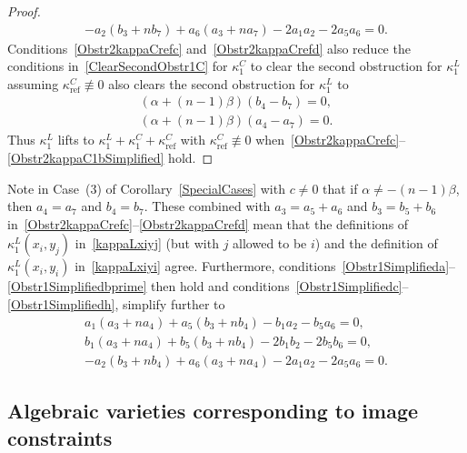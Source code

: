 \documentclass[pdftex]{sigma}
\numberwithin{equation}{section}
\DeclareMathOperator{\refl}{ref}
\begin{document}
\begin{proof}
\begin{gather}
\label{Obstr1Simplifiedh}
-a_2(b_3 + nb_7) + a_6(a_3 + na_7) - 2a_1 a_2 -2a_5 a_6=0.
\end{gather}
Conditions~\eqref{Obstr2kappaCrefc} and~\eqref{Obstr2kappaCrefd} also reduce the conditions in~\eqref{ClearSecondObstr1C} for $\kappa^C_1$ to
clear the second obstruction for $\kappa^L_1$ assuming $\kappa^C_{\refl} \not\equiv 0$
also clears the second obstruction for $\kappa^L_1$ to
\begin{gather}
\label{Obstr2kappaC1aSimplified}
(\alpha+(n-1)\beta)(b_4-b_7)=0, \\
\label{Obstr2kappaC1bSimplified}
(\alpha+(n-1)\beta)(a_4-a_7)=0.
\end{gather}
Thus
$\kappa^L_1$ lifts to $\kappa^L_1+\kappa^C_1+\kappa^C_{\refl}$ with $\kappa^C_{\refl}\not\equiv 0$
when~\eqref{Obstr2kappaCrefc}--\eqref{Obstr2kappaC1bSimplified} hold.
\end{proof}

\begin{Remark}
Note in Case~(3) of Corollary~\ref{SpecialCases} with $c \neq 0$ that if $\alpha \neq -(n-1)\beta$, then $a_4=a_7$ and $b_4=b_7$.
These combined with $a_3=a_5+a_6$ and $b_3=b_5+b_6$
in~\eqref{Obstr2kappaCrefc}--\eqref{Obstr2kappaCrefd}
mean that the definitions of $\kappa^L_1(x_i,y_j)$ in~\eqref{kappaLxiyj} (but with
$j$ allowed to be $i$) and the definition of~$\kappa^L_1(x_i,y_i)$ in~\eqref{kappaLxiyi}
agree.
Furthermore, conditions~\eqref{Obstr1Simplifieda}--\eqref{Obstr1Simplifiedbprime} then hold and
conditions~\eqref{Obstr1Simplifiedc}--\eqref{Obstr1Simplifiedh},
simplify further to
\begin{gather*}
a_1(a_3 + na_4) + a_5(b_3 + nb_4) - b_1 a_2 - b_5 a_6=0, \\
b_1(a_3 + na_4) + b_5(b_3 + nb_4)- 2b_1 b_2 - 2b_5 b_6=0, \\
-a_2(b_3 + nb_4) + a_6(a_3 + na_4) - 2a_1 a_2 - 2a_5 a_6=0.
\end{gather*}
\end{Remark}

\subsection{Algebraic varieties corresponding to image constraints}\label{algvars}
\end{document}
